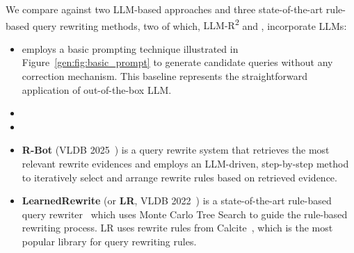  We compare \genrewrite against two LLM-based approaches and three state-of-the-art rule-based query rewriting methods, two of which, \textsc{LLM-R\textsuperscript{2}} and \rbot, incorporate LLMs:
\begin{itemize}[leftmargin=0.5cm]
    \item \textbf{\baseline} employs a basic prompting technique illustrated in Figure~\ref{gen:fig:basic_prompt} to generate candidate queries without any correction mechanism. 
        This baseline represents the straightforward application of out-of-the-box LLM.

        \item {}
        
  

    \item {}

    \item \textbf{R-Bot} (VLDB 2025~\cite{sun2024r}) is a query rewrite system that retrieves the most relevant rewrite evidences and employs an LLM-driven, step-by-step method to iteratively select and arrange rewrite rules based on retrieved evidence.

      \item \textbf{LearnedRewrite} (or \textbf{LR}, VLDB 2022~\cite{LR}) is a state-of-the-art rule-based query rewriter~\cite{LR} which uses Monte Carlo Tree Search to guide the rule-based rewriting process. LR uses rewrite rules from Calcite~\cite{begoli2018apache}, which is the most popular library for query rewriting rules.



\end{itemize}
